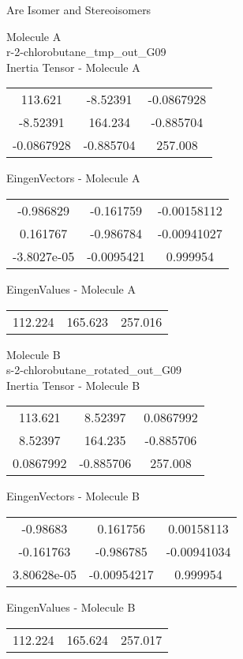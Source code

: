 \begin{center}
\vtab
\vtab
\textcolor{NavyBlue}{\Large Are Isomer and Stereoisomers}
\end{center}
\newpage
\begin{multicols}{2}
\begin{center}
Molecule A \\ 
r-2-chlorobutane\_tmp\_out\_G09
\\
Inertia Tensor - Molecule A \\
\vtab
\begin{tabular}{|c c c|}
113.621	 & 	-8.52391	 & 	-0.0867928	 \\
-8.52391	 & 	164.234	 & 	-0.885704	 \\
-0.0867928	 & 	-0.885704	 & 	257.008
\end{tabular}

\vtab
 EingenVectors - Molecule A     \\
\vtab
\begin{tabular}{|c c c|}
-0.986829	 & 	-0.161759	 & 	-0.00158112	 \\
0.161767	 & 	-0.986784	 & 	-0.00941027	 \\
-3.8027e-05	 & 	-0.0095421	 & 	0.999954
\end{tabular}

\vtab
 EingenValues - Molecule A     \\
\vtab
\begin{tabular}{|c c c|}
112.224	 & 	165.623	 & 	257.016
\end{tabular}
\columnbreak

Molecule B \\ 
s-2-chlorobutane\_rotated\_out\_G09
\\
Inertia Tensor - Molecule B \\
\vtab
\begin{tabular}{|c c c|}
113.621	 & 	8.52397	 & 	0.0867992	 \\
8.52397	 & 	164.235	 & 	-0.885706	 \\
0.0867992	 & 	-0.885706	 & 	257.008
\end{tabular}

\vtab
 EingenVectors - Molecule B     \\
\vtab
\begin{tabular}{|c c c|}
-0.98683	 & 	0.161756	 & 	0.00158113	 \\
-0.161763	 & 	-0.986785	 & 	-0.00941034	 \\
3.80628e-05	 & 	-0.00954217	 & 	0.999954
\end{tabular}

\vtab
 EingenValues - Molecule B     \\
\vtab
\begin{tabular}{|c c c|}
112.224	 & 	165.624	 & 	257.017
\end{tabular}

\end{center}
\end{multicols}
